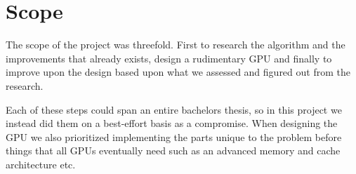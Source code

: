 	\section{Scope}
		
		The scope of the project was threefold. First to research the algorithm
		and the improvements that already exists, design a rudimentary GPU and
		finally to improve upon the design based upon what we assessed and
		figured out from the research.

		Each of these steps could span an entire bachelors thesis, so in this
		project we instead did them on a best-effort basis as a compromise.
		When designing the GPU we also prioritized implementing the parts
		unique to the problem before things that all GPUs eventually need such
		as an advanced memory and cache architecture etc.
